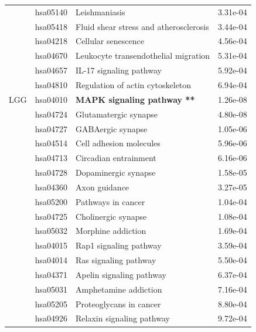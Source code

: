 \begin{longtable}{cllr}
 & hsa05140 & \textcolor{\clrnew}{Leishmaniasis} & 3.31e-04 \\ 
 & hsa05418 & \textcolor{\clrnew}{Fluid shear stress and atherosclerosis} & 3.44e-04 \\ 
 & hsa04218 & \textcolor{\clrnew}{Cellular senescence} & 4.56e-04 \\ 
 & hsa04670 & \textcolor{\clrnew}{Leukocyte transendothelial migration} & 5.31e-04 \\ 
 & hsa04657 & \textcolor{\clrnew}{IL-17 signaling pathway} & 5.92e-04 \\ 
 & hsa04810 & \textcolor{\clrnew}{Regulation of actin cytoskeleton} & 6.94e-04 \\ 
\midrule 
\rowcolor{\clrpath}LGG & hsa04010 & \textbf{MAPK signaling pathway **} & 1.26e-08\\ 
 & hsa04724 & \textcolor{\clrnew}{Glutamatergic synapse} & 4.80e-08 \\ 
 & hsa04727 & \textcolor{\clrnew}{GABAergic synapse} & 1.05e-06 \\ 
 & hsa04514 & \textcolor{\clrnew}{Cell adhesion molecules} & 5.96e-06 \\ 
 & hsa04713 & \textcolor{\clrnew}{Circadian entrainment} & 6.16e-06 \\ 
 & hsa04728 & \textcolor{\clrnew}{Dopaminergic synapse} & 1.58e-05 \\ 
 & hsa04360 & \textcolor{\clrnew}{Axon guidance} & 3.27e-05 \\ 
 & hsa05200 & \textcolor{\clrnew}{Pathways in cancer} & 1.04e-04 \\ 
 & hsa04725 & \textcolor{\clrnew}{Cholinergic synapse} & 1.08e-04 \\ 
 & hsa05032 & \textcolor{\clrnew}{Morphine addiction} & 1.69e-04 \\ 
 & hsa04015 & \textcolor{\clrnew}{Rap1 signaling pathway} & 3.59e-04 \\ 
 & hsa04014 & \textcolor{\clrnew}{Ras signaling pathway} & 5.50e-04 \\ 
 & hsa04371 & \textcolor{\clrnew}{Apelin signaling pathway} & 6.37e-04 \\ 
 & hsa05031 & \textcolor{\clrnew}{Amphetamine addiction} & 7.16e-04 \\ 
 & hsa05205 & \textcolor{\clrnew}{Proteoglycans in cancer} & 8.80e-04 \\ 
 & hsa04926 & \textcolor{\clrnew}{Relaxin signaling pathway} & 9.72e-04 \\ 
\midrule 
\end{longtable} 

